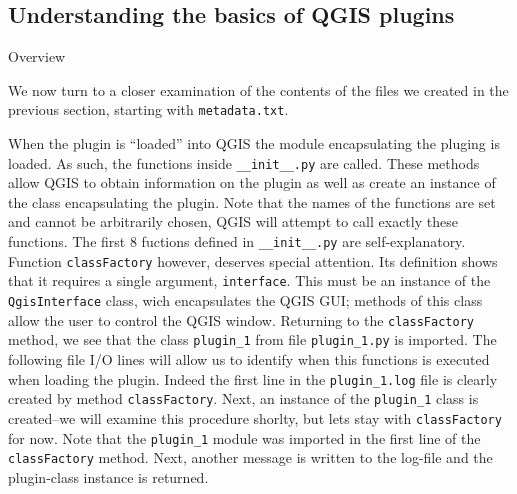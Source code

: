\subsection{Understanding the basics of QGIS plugins}
\label{ssect:understanding_plugin_basics}
\par%
Overview
\par%
We now turn to a closer examination of the contents of the files we created in the previous section, starting with \lstinline{metadata.txt}. 
\par%
When the plugin is ``loaded'' into QGIS the module encapsulating the pluging is loaded. As such, the functions inside \lstinline{__init__.py} are called. These methods allow QGIS to obtain information on the plugin as well as create an instance of the class encapsulating the plugin. Note that the names of the functions are set and cannot be arbitrarily chosen, QGIS will attempt to call exactly these functions. The first $8$ fuctions defined in \lstinline{__init__.py} are self-explanatory. Function \lstinline{classFactory} however, deserves special attention. Its definition shows that it requires a single argument, \lstinline{interface}. This must be an instance of the \lstinline{QgisInterface} class, wich encapsulates the QGIS GUI; methods of this class allow the user to control the QGIS window. Returning to the \lstinline{classFactory} method, we see that the class \lstinline{plugin_1} from file \lstinline{plugin_1.py} is imported. The following file I/O lines will allow us to identify when this functions is executed when loading the plugin. Indeed the first line in the \lstinline{plugin_1.log} file is clearly created by method \lstinline{classFactory}. Next, an instance of the \lstinline{plugin_1} class is created--we will examine this procedure shorlty, but lets stay with \lstinline{classFactory} for now. Note that the \lstinline{plugin_1} module was imported in the first line of the \lstinline{classFactory} method. Next, another message is written to the log-file and the plugin-class instance is returned.
\par%
